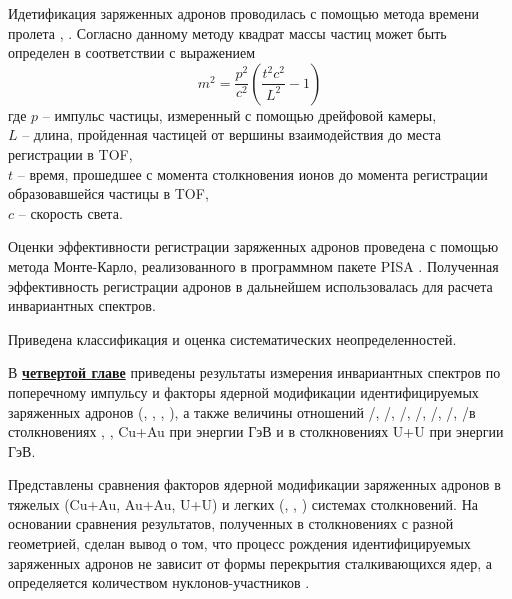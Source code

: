 Идетификация заряженных адронов проводилась с помощью метода времени пролета \autocite{nucleus2020}, \cite{PPG026, ppg146}. Согласно данному методу  квадрат массы частиц может быть определен в соответствии с выражением 
$$m^2 = \frac{p^2}{c^2} \left(  \frac{t^2 c^2}{L^2} - 1\right)$$
где $p$ -- импульс частицы, измеренный с помощью дрейфовой камеры, \\
$L$ -- длина, пройденная частицей от вершины взаимодействия до места регистрации в TOF, \\
$t$ -- время, прошедшее с момента столкновения ионов до момента регистрации образовавшейся частицы в TOF, \\
$c$ -- скорость света.

Оценки эффективности регистрации заряженных адронов проведена с помощью метода Монте-Карло, реализованного в программном пакете PISA \cite{PISA}. Полученная эффективность регистрации адронов в дальнейшем использовалась для расчета инвариантных спектров. 

Приведена классификация и оценка систематических неопределенностей. %

\begin{comment}
Формулы в строку без номера добавляются так:
\[
    \lambda_{T_s} = K_x\frac{d{x}}{d{T_s}}, \qquad
    \lambda_{q_s} = K_x\frac{d{x}}{d{q_s}},
\]
\end{comment}

В \underline{\textbf{четвертой главе}} приведены результаты измерения инвариантных спектров по поперечному импульсу и факторы ядерной модификации идентифицируемых заряженных адронов (\pipm, \Kpm, \prot, \aprot), а также величины отношений \pim/\pip, \Km/\Kp, \prot/\aprot, \prot/\pip, \aprot/\pim, \Kp/\pip, \Km/\pim в столкновениях  \pal, \heau, Cu+Au при энергии  ГэВ и в столкновениях U+U при энергии  ГэВ. 

Представлены сравнения факторов ядерной модификации заряженных адронов в тяжелых (Cu+Au, Au+Au, U+U) и легких (\pal, \dau, \heau) системах столкновений.
На основании сравнения результатов, полученных в столкновениях с разной геометрией, сделан вывод о том, что процесс рождения идентифицируемых заряженных адронов не зависит от формы перекрытия сталкивающихся ядер, а определяется количеством нуклонов-участников \Npart.

